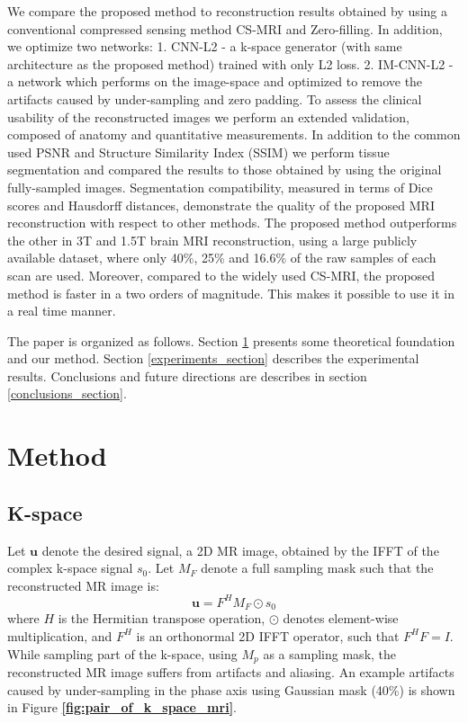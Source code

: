 \documentclass[review]{elsarticle}
\begin{document}
We compare the proposed method to reconstruction results obtained by using a conventional compressed sensing method CS-MRI \cite{lustig2007sparse} and Zero-filling. In addition, we optimize two networks: 1. CNN-L2 - a k-space generator (with same architecture as the proposed method) trained with only L2 loss. 2. IM-CNN-L2 - a network which performs on the image-space and optimized to remove the artifacts caused by under-sampling and zero padding.
To assess the clinical usability of the reconstructed images we perform an extended validation, composed of anatomy and quantitative measurements. In addition to the common used PSNR and Structure Similarity Index (SSIM) we perform tissue segmentation and compared the results to those obtained by using the original fully-sampled images.
Segmentation compatibility, measured in terms of Dice scores and Hausdorff distances, demonstrate the quality of the proposed MRI reconstruction with respect to other methods. The proposed method outperforms the other in 3T and 1.5T brain MRI reconstruction, using a large publicly available dataset, where only 40\%, 25\% and 16.6\% of the raw samples of each scan are used. Moreover, compared to the widely used CS-MRI, the proposed method is faster in a two orders of magnitude. This makes it possible to use it in a real time manner.

The paper is organized as follows. Section \ref{method_section} presents some theoretical foundation and our method. Section \ref{experiments_section} describes the experimental results. Conclusions and future directions are describes in section \ref{conclusions_section}.

\section{Method}\label{method_section}

\subsection{K-space}
Let $\bm{u}$ denote the desired signal, a 2D MR image, obtained by the IFFT of the complex k-space signal $s_{0}$. Let $M_{F}$ denote a full sampling mask such that the reconstructed MR image is: 
\begin{equation}
\bm{u}=F^{H}M_{F}\odot s_{0}
\end{equation} 
where $H$ is the Hermitian transpose operation, $\odot$ denotes element-wise multiplication, and $F^{H}$ is an orthonormal 2D IFFT operator, such that $F^{H}F=I$. 
While sampling part of the k-space, using $M_{p}$ as a sampling mask, the reconstructed MR image suffers from artifacts and aliasing. An example artifacts caused by under-sampling in the phase axis using Gaussian mask (40\%) is shown in Figure \textbf{\ref{fig:pair_of_k_space_mri}}.
\end{document}
